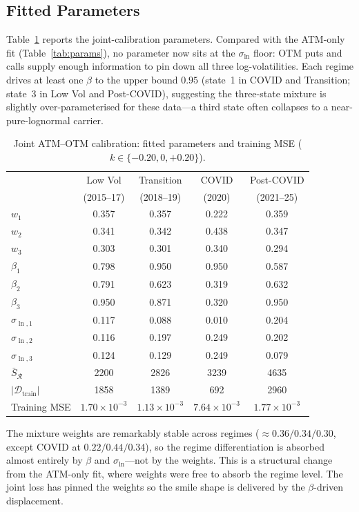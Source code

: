 \documentclass[12pt]{article}
\begin{document}
\subsection{Fitted Parameters}

Table~\ref{tab:joint_params} reports the joint-calibration parameters. Compared with the ATM-only fit (Table~\ref{tab:params}), no parameter now sits at the $\sigma_{\ln}$ floor: OTM puts and calls supply enough information to pin down all three log-volatilities. Each regime drives at least one $\beta$ to the upper bound $0.95$ (state~1 in COVID and Transition; state~3 in Low Vol and Post-COVID), suggesting the three-state mixture is slightly over-parameterised for these data---a third state often collapses to a near-pure-lognormal carrier.

\begin{table}[htbp]
\centering
\caption{Joint ATM--OTM calibration: fitted parameters and training MSE ($k \in \{-0.20,0,+0.20\}$).}
\label{tab:joint_params}
\small
\begin{tabular}{lcccc}
\toprule
& Low Vol & Transition & COVID & Post-COVID \\
& (2015--17) & (2018--19) & (2020) & (2021--25) \\
\midrule
$w_1$ & 0.357 & 0.357 & 0.222 & 0.359 \\
$w_2$ & 0.341 & 0.342 & 0.438 & 0.347 \\
$w_3$ & 0.303 & 0.301 & 0.340 & 0.294 \\
\midrule
$\beta_1$ & 0.798 & 0.950 & 0.950 & 0.587 \\
$\beta_2$ & 0.791 & 0.623 & 0.319 & 0.632 \\
$\beta_3$ & 0.950 & 0.871 & 0.320 & 0.950 \\
\midrule
$\sigma_{\ln,1}$ & 0.117 & 0.088 & 0.010 & 0.204 \\
$\sigma_{\ln,2}$ & 0.116 & 0.197 & 0.249 & 0.202 \\
$\sigma_{\ln,3}$ & 0.124 & 0.129 & 0.249 & 0.079 \\
\midrule
$\bar S_{\mathcal R}$ & 2200 & 2826 & 3239 & 4635 \\
$|\mathcal{D}_{\text{train}}|$ & 1858 & 1389 & 692 & 2960 \\
Training MSE & $1.70\!\times\!10^{-3}$ & $1.13\!\times\!10^{-3}$ & $7.64\!\times\!10^{-3}$ & $1.77\!\times\!10^{-3}$ \\
\bottomrule
\end{tabular}
\end{table}

The mixture weights are remarkably stable across regimes ($\approx 0.36/0.34/0.30$, except COVID at $0.22/0.44/0.34$), so the regime differentiation is absorbed almost entirely by $\beta$ and $\sigma_{\ln}$---not by the weights. This is a structural change from the ATM-only fit, where weights were free to absorb the regime level. The joint loss has pinned the weights so the smile shape is delivered by the $\beta$-driven displacement.
\end{document}

